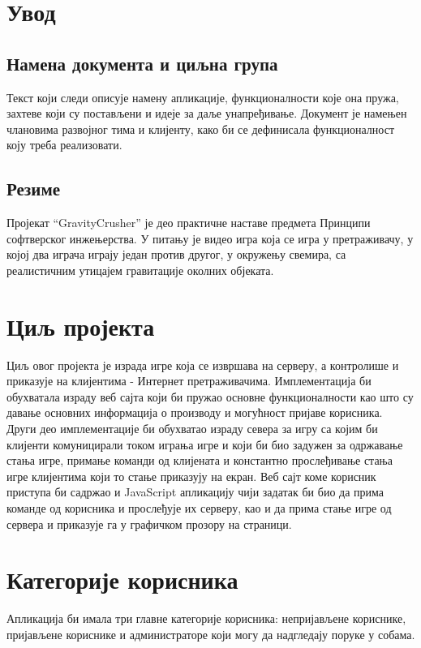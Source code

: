 \section{Увод}

\subsection{Намена документа и циљна група}
Текст који следи описује намену апликације, функционалности које она пружа, захтеве који су постављени и идеје за 
даље унапређивање. Документ је намењен члановима развојног тима и клијенту, како би се дефинисала функционалност
коју треба  реализовати.

\subsection{Резиме}
Пројекат “GravityCrusher” је део практичне наставе предмета Принципи софтверског инжењерства. У питању је 
видео игра која се игра у претраживачу, у којој два играча играју један против другог, у окружењу свемира,
са реалистичним утицајем гравитације околних објеката.



\section{Циљ пројекта}
Циљ овог пројекта је израда игре која се извршава на серверу, а контролише и приказује на 
клијентима - Интернет претраживачима. Имплементација би обухватала израду веб сајта који би пружао основне 
функционалности као што су давање основних информација о производу и могућност пријаве корисника. 
Други део имплементације би обухватао израду севера за игру са којим би клијенти комуницирали током играња игре
и који би био задужен за одржавање стања игре, примање команди од клијената и константно прослеђивање стања игре
клијентима који то стање приказују на екран. Веб сајт коме корисник приступа би садржао и JavaScript
апликацију чији задатак би био да прима команде од корисника и прослеђује их серверу, 
као и да прима стање игре од сервера и приказује га у графичком прозору на страници.



\section{Категорије корисника}
Апликација би имала три главне категорије корисника: непријављене кориснике, пријављене кориснике и
администраторе који могу да надгледају поруке у собама.

